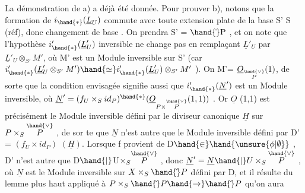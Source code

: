 La démonstration de a) a déjà été donnée. Pour prouver b), notons
que la formation de $i_{\hand{*}}(\underline{L}_U)$ commute avec toute extension plate de la
base S' \quad S (réf), donc  
 changement de base . On
prendra S' = $\hand{\check{}}\mathrm{P}$ , et on note que l'hypothèse $i'_{\hand{*}}(\underline{L}'_U)$ inversible ne
change pas en remplaçant $\underline{L}'_U$ par $\underline{L}'_U\otimes_{S'}M'$, où M' est un Module inversible
sur S' (car $i'_{\hand{*}}(\underline{L}'_U\otimes_{S'}M')\hand{\simeq} i'_{\hand{*}}(\underline{L}'_U)\otimes_{S'}M'$ ). On  M'= $\underline{O}_{\overset{\hand{\vee}}{P}}(1)$, de
sorte que la condition envisagée signifie aussi que $i'_{\hand{*}}(\underline{N}')$ est un Module
inversible, où $\underline{N}'= (f_U\times_S id_P)^{\hand{*}}(\underline{O}_{P\times\overset{\hand{\vee}}{P}}(1,1))$ . Or $\underline{O}$ (1,1) est précisément
le Module inversible défini par le diviseur canonique $\underline{H}$ sur $P\times_S\overset{\hand{\vee}}{P}$ , de sor%
te que $\underline{N}$ n'est autre que le Module inversible défini par \qquad D' =
$(f_U\times id_P)$ $(\underline{H})$.  Lorsque f provient de D$\hand{\in}\hand{\unsure{\phi|\emptyset}}$ , 
D' n'est autre que D$\hand{|}$U$\times_S\overset{\hand{\vee}}{P}$ ,  donc $\underline{N}' = \underline{N}\hand{|}U\times_S\overset{\hand{\vee}}{P}$ ,
où $\underline{N}$ est le Module inversible sur $X\times_S\hand{\check{}}P$ défini par D, et il résulte
du lemme  plus haut  appliqué à $P\times_S\hand{\check{}}P\hand{\to}\hand{\check{}}P$ qu'on aura

